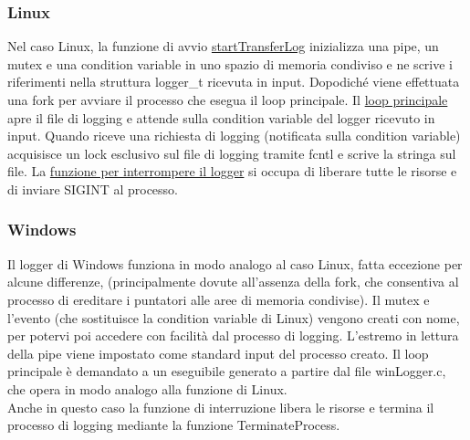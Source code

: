 \documentclass{article}
\begin{document}
\subsubsection{Linux}
Nel caso Linux, la funzione di avvio \href{html/logger_8c.html#a568bb98500e52ddc98667703cdc46927}{startTransferLog} inizializza una pipe, un mutex e una condition variable
in uno spazio di memoria condiviso e ne scrive i riferimenti nella struttura logger\_t ricevuta in input.
Dopodiché viene effettuata una fork per avviare il processo che esegua il loop principale.
Il \href{html/logger_8c.html#a27125c21f8cde1856449d4e02e42f156}{loop principale} apre il file di logging e attende sulla condition variable del logger ricevuto in input.
Quando riceve una richiesta di logging (notificata sulla condition variable) acquisisce un lock
esclusivo sul file di logging tramite fcntl e scrive la stringa sul file.
La \href{html/logger_8c.html#a5a3ad1e6309f96bc43ab8e56ea8ffd39}{funzione per interrompere il logger} si occupa di liberare tutte le risorse e di inviare SIGINT
al processo.

\subsubsection{Windows}
Il logger di Windows funziona in modo analogo al caso Linux, fatta eccezione per alcune differenze,
(principalmente dovute all'assenza della fork, che consentiva al processo di ereditare i puntatori alle
aree di memoria condivise).
Il mutex e l'evento (che sostituisce la condition variable di Linux) vengono creati con nome, per
potervi poi accedere con facilità dal processo di logging. L'estremo in lettura della pipe viene 
impostato come standard input del processo creato. Il loop principale è demandato a un eseguibile
generato a partire dal file winLogger.c, che opera in modo analogo alla funzione di Linux.\\
Anche in questo caso la funzione di interruzione libera le risorse e termina il processo di logging
mediante la funzione TerminateProcess.
\end{document}
